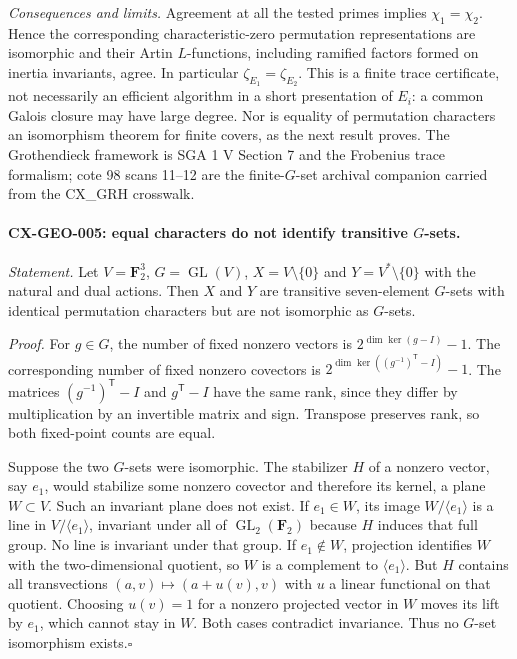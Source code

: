 \emph{Consequences and limits.} Agreement at all the tested primes implies
$\chi_1=\chi_2$. Hence the corresponding characteristic-zero permutation
representations are isomorphic and their Artin $L$-functions, including
ramified factors formed on inertia invariants, agree. In particular
$\zeta_{E_1}=\zeta_{E_2}$. This is a finite trace certificate, not necessarily
an efficient algorithm in a short presentation of $E_i$: a common Galois
closure may have large degree. Nor is equality of permutation characters
an isomorphism theorem for finite covers, as the next result proves.
The Grothendieck framework is SGA 1 V Section 7 and the Frobenius trace
formalism; cote 98 scans 11--12 are the finite-$G$-set archival companion
carried from the CX\_GRH crosswalk.

\paragraph{CX-GEO-005: equal characters do not identify transitive $G$-sets.}
\emph{Statement.} Let $V=\mathbf F_2^3$, $G=\operatorname{GL}(V)$,
$X=V\setminus\{0\}$ and $Y=V^*\setminus\{0\}$ with the natural and dual
actions. Then $X$ and $Y$ are transitive seven-element $G$-sets with identical
permutation characters but are not isomorphic as $G$-sets.

\emph{Proof.} For $g\in G$, the number of fixed nonzero vectors is
$2^{\dim\ker(g-I)}-1$. The corresponding number of fixed nonzero covectors
is $2^{\dim\ker((g^{-1})^{\mathsf T}-I)}-1$. The matrices
$(g^{-1})^{\mathsf T}-I$ and $g^{\mathsf T}-I$ have the same rank, since
they differ by multiplication by an invertible matrix and sign. Transpose
preserves rank, so both fixed-point counts are equal.

Suppose the two $G$-sets were isomorphic. The stabilizer $H$ of a nonzero
vector, say $e_1$, would stabilize some nonzero covector and therefore its
kernel, a plane $W\subset V$. Such an invariant plane does not exist.
If $e_1\in W$, its image $W/\langle e_1\rangle$ is a line in
$V/\langle e_1\rangle$, invariant under all of
$\operatorname{GL}_2(\mathbf F_2)$ because $H$ induces that full group.
No line is invariant under that group. If $e_1\notin W$, projection identifies
$W$ with the two-dimensional quotient, so $W$ is a complement to
$\langle e_1\rangle$. But $H$ contains all transvections
$(a,v)\mapsto(a+u(v),v)$ with $u$ a linear functional on that quotient.
Choosing $u(v)=1$ for a nonzero projected vector in $W$ moves its lift by
$e_1$, which cannot stay in $W$. Both cases contradict invariance.
Thus no $G$-set isomorphism exists.\hfill$\square$

